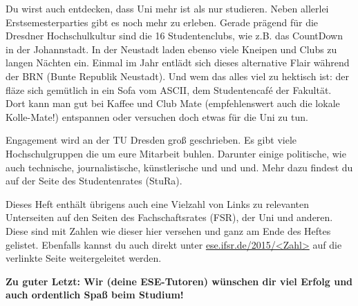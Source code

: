 Du wirst auch entdecken, dass Uni mehr ist als nur studieren. 
Neben allerlei Erstsemesterparties gibt es noch mehr zu erleben. 
Gerade prägend für die Dresdner Hochschulkultur sind die 16 Studentenclubs, wie z.B. das CountDown in der Johannstadt. 
In der Neustadt laden ebenso viele Kneipen und Clubs zu langen Nächten ein. 
Einmal im Jahr entlädt sich dieses alternative Flair während der BRN (Bunte Republik Neustadt). 
Und wem das alles viel zu hektisch ist: der fläze sich gemütlich in ein Sofa vom ASCII, dem Studentencafé der Fakultät. 
Dort kann man gut bei Kaffee und Club Mate (empfehlenswert auch die lokale Kolle-Mate!) entspannen oder versuchen doch etwas für die Uni zu tun.

Engagement wird an der TU Dresden groß geschrieben. 
Es gibt viele Hochschulgruppen die um eure Mitarbeit buhlen. 
Darunter einige politische, wie auch technische, journalistische, künstlerische und und und. Mehr dazu findest du auf der Seite des Studentenrates (StuRa).

Dieses Heft enthält übrigens auch eine Vielzahl von Links zu relevanten Unterseiten auf den Seiten des Fachschaftsrates (FSR), der Uni und anderen. 
Diese sind mit Zahlen wie dieser hier  versehen und ganz am Ende des Heftes gelistet. Ebenfalls kannst du auch direkt unter \url{ese.ifsr.de/2015/<Zahl>} auf die verlinkte Seite weitergeleitet werden.

\textbf{Zu guter Letzt: Wir (deine ESE-Tutoren) wünschen dir viel Erfolg und auch ordentlich Spaß beim Studium!}
